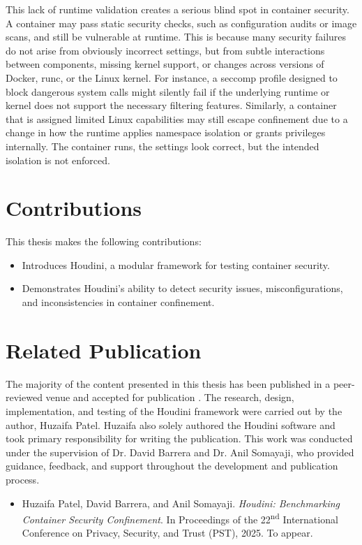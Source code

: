 \begin{doublespace}
This lack of runtime validation creates a serious blind spot in container security. A container may pass static security checks, such as configuration audits or image scans, and still be vulnerable at runtime. This is because many security failures do not arise from obviously incorrect settings, but from subtle interactions between components, missing kernel support, or changes across versions of Docker, runc, or the Linux kernel. For instance, a seccomp profile designed to block dangerous system calls might silently fail if the underlying runtime or kernel does not support the necessary filtering features. Similarly, a container that is assigned limited Linux capabilities may still escape confinement due to a change in how the runtime applies namespace isolation or grants privileges internally. The container runs, the settings look correct, but the intended isolation is not enforced.



\section{Contributions}

This thesis makes the following contributions:
\begin{itemize}
    \item Introduces Houdini, a modular framework for testing container security.
    \item Demonstrates Houdini’s ability to detect security issues, misconfigurations, and inconsistencies in container confinement.
\end{itemize}

\section{Related Publication}

The majority of the content presented in this thesis has been published in a peer-reviewed venue and accepted for publication \cite{houdini}. The research, design, implementation, and testing of the Houdini framework were carried out by the author, Huzaifa Patel. Huzaifa also solely authored the Houdini software and took primary responsibility for writing the publication. This work was conducted under the supervision of Dr. David Barrera and Dr. Anil Somayaji, who provided guidance, feedback, and support throughout the development and publication process.

\begin{itemize}
    \item Huzaifa Patel, David Barrera, and Anil Somayaji. \textit{Houdini: Benchmarking Container Security Confinement}. In Proceedings of the 22\textsuperscript{nd} International Conference on Privacy, Security, and Trust (PST), 2025. To appear.
\end{itemize}



\end{doublespace}
